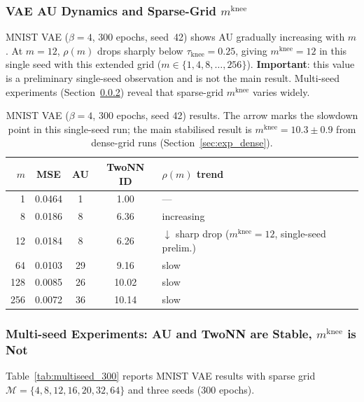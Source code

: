 \documentclass[11pt,a4paper]{article}
\newcommand{\mknee}{m^{\mathrm{knee}}}
\begin{document}
\subsubsection{VAE AU Dynamics and Sparse-Grid $\mknee$}

MNIST VAE ($\beta=4$, 300 epochs, seed~42) shows AU gradually increasing with $m$.
At $m=12$, $\rho(m)$ drops sharply below $\tau_{\mathrm{knee}}=0.25$,
giving $\mknee=12$ in this single seed with this extended grid
($m\in\{1,4,8,\ldots,256\}$).
\textbf{Important}: this value is a preliminary single-seed observation and is
not the main result.
Multi-seed experiments (Section~\ref{sec:exp_multiseed}) reveal that
sparse-grid $\mknee$ varies widely.

\begin{table}[ht]
\centering
\caption{MNIST VAE ($\beta=4$, 300 epochs, seed 42) results.
The arrow marks the slowdown point in this single-seed run; the main
stabilised result is $\mknee=10.3\pm0.9$ from dense-grid runs
(Section~\ref{sec:exp_dense}).}
\label{tab:e4_vae}
\small
\begin{tabular}{rcccl}
\toprule
$m$ & MSE & AU & TwoNN ID & $\rho(m)$ trend \\
\midrule
1  & 0.0464 & 1  & 1.00 & --- \\
8  & 0.0186 & 8  & 6.36 & increasing \\
12 & 0.0184 & 8  & 6.26 & $\downarrow$ sharp drop ($\mknee=12$, single-seed prelim.) \\
64 & 0.0103 & 29 & 9.16 & slow \\
128& 0.0085 & 26 & 10.02& slow \\
256& 0.0072 & 36 & 10.14& slow \\
\bottomrule
\end{tabular}
\end{table}

\subsubsection{Multi-seed Experiments: AU and TwoNN are Stable, $\mknee$ is Not}
\label{sec:exp_multiseed}

Table~\ref{tab:multiseed_300} reports MNIST VAE results with sparse grid
$\mathcal{M}=\{4,8,12,16,20,32,64\}$ and three seeds (300 epochs).
\end{document}
